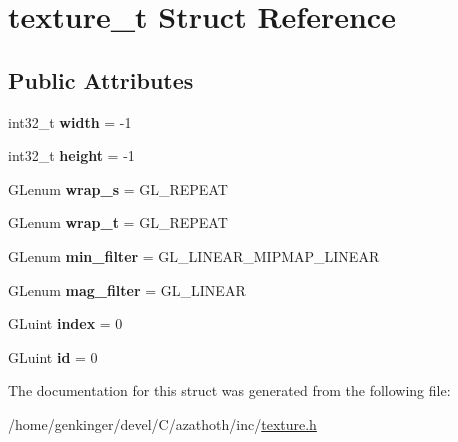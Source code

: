 \hypertarget{structtexture__t}{}\section{texture\+\_\+t Struct Reference}
\label{structtexture__t}
\subsection*{Public Attributes}
\begin{DoxyCompactItemize}
\item 
\mbox{\label{structtexture__t_a44b4ded1610f593b1e101a708d8eed67}} 
int32\+\_\+t {\bfseries width} = -\/1
\item 
\mbox{\label{structtexture__t_a864afa42205fa8cf7fcaef9b1aa972fd}} 
int32\+\_\+t {\bfseries height} = -\/1
\item 
\mbox{\label{structtexture__t_aa15f8e13840f041263afbe8dd7edf741}} 
G\+Lenum {\bfseries wrap\+\_\+s} = G\+L\+\_\+\+R\+E\+P\+E\+AT
\item 
\mbox{\label{structtexture__t_aac1199de3d773ce80db151382a6a3f1b}} 
G\+Lenum {\bfseries wrap\+\_\+t} = G\+L\+\_\+\+R\+E\+P\+E\+AT
\item 
\mbox{\label{structtexture__t_a718f2c925f57709837570351ded3e55f}} 
G\+Lenum {\bfseries min\+\_\+filter} = G\+L\+\_\+\+L\+I\+N\+E\+A\+R\+\_\+\+M\+I\+P\+M\+A\+P\+\_\+\+L\+I\+N\+E\+AR
\item 
\mbox{\label{structtexture__t_a8fa4a06e9236cd45a65a8c330ffb66f4}} 
G\+Lenum {\bfseries mag\+\_\+filter} = G\+L\+\_\+\+L\+I\+N\+E\+AR
\item 
\mbox{\label{structtexture__t_afd83c913baef5ef326fc1413bf1b1494}} 
G\+Luint {\bfseries index} = 0
\item 
\mbox{\label{structtexture__t_a0c732b877513c17cb9c6b73b488f1509}} 
G\+Luint {\bfseries id} = 0
\end{DoxyCompactItemize}


The documentation for this struct was generated from the following file\+:\begin{DoxyCompactItemize}
\item 
/home/genkinger/devel/\+C/azathoth/inc/\mbox{\hyperlink{texture_8h}{texture.\+h}}\end{DoxyCompactItemize}
